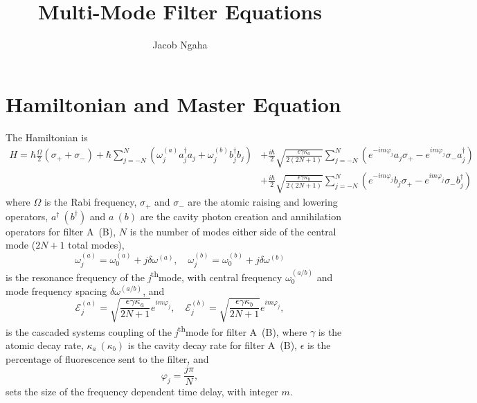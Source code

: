 \documentclass{article}
\title{Multi-Mode Filter Equations}
\author{Jacob Ngaha}
\newcommand{\ssth}{\textsuperscript{th}}
\begin{document}
\maketitle

\section{Hamiltonian and Master Equation}

The Hamiltonian is
\begin{align}\label{hamiltonian}
	H = \hbar \frac{\Omega}{2} \left(\sigma_{+} + \sigma_{-}\right) + \hbar \sum_{j=-N}^{N} \left( \omega_{j}^{(a)} a^{\dagger}_{j} a_{j} + \omega_{j}^{(b)} b^{\dagger}_{j} b_{j} \right) &+ \frac{i \hbar}{2} \sqrt{\frac{\epsilon \gamma \kappa_{a}}{2 \left( 2N+1 \right)}} \sum_{j=-N}^{N} \left( e^{-i m \varphi_{j}} a_{j} \sigma_{+} - e^{i m \varphi_{j}} \sigma_{-} a^{\dagger}_{j} \right) \nonumber \\
	&+ \frac{i \hbar}{2} \sqrt{\frac{\epsilon \gamma \kappa_{b}}{2 \left( 2N+1 \right)}} \sum_{j=-N}^{N} \left( e^{-i m \varphi_{j}} b_{j} \sigma_{+} - e^{i m \varphi_{j}} \sigma_{-} b^{\dagger}_{j} \right)
\end{align}
where $\Omega$ is the Rabi frequency, $\sigma_{+}$ and $\sigma_{-}$ are the atomic raising and lowering operators, $a^{\dagger}~(b^{\dagger})$ and $a~(b)$ are the cavity photon creation and annihilation operators for filter A~(B), $N$ is the number of modes either side of the central mode ($2N+1$ total modes),
\begin{equation}
	\omega_{j}^{(a)} = \omega_{0}^{(a)} + j \delta\omega^{(a)}, \quad \omega_{j}^{(b)} = \omega_{0}^{(b)} + j \delta\omega^{(b)}
\end{equation}
is the resonance frequency of the \textit{j}\ssth mode, with central frequency $\omega_{0}^{(a/b)}$ and mode frequency spacing $\delta\omega^{(a/b)}$, and
\begin{equation}
	\mathcal{E}_{j}^{(a)} = \sqrt{\frac{\epsilon \gamma \kappa_{a}}{2N + 1}} e^{i m \varphi_{j}}, \quad \mathcal{E}_{j}^{(b)} = \sqrt{\frac{\epsilon \gamma \kappa_{b}}{2N + 1}} e^{i m \varphi_{j}},
\end{equation}
is the cascaded systems coupling of the \textit{j}\ssth mode for filter A~(B), where $\gamma$ is the atomic decay rate, $\kappa_{a}~(\kappa_{b})$ is the cavity decay rate for filter A~(B), $\epsilon$ is the percentage of fluorescence sent to the filter, and
\begin{equation}
	\varphi_{j} = \frac{j \pi}{N},
\end{equation}
sets the size of the frequency dependent time delay, with integer $m$.
\end{document}
